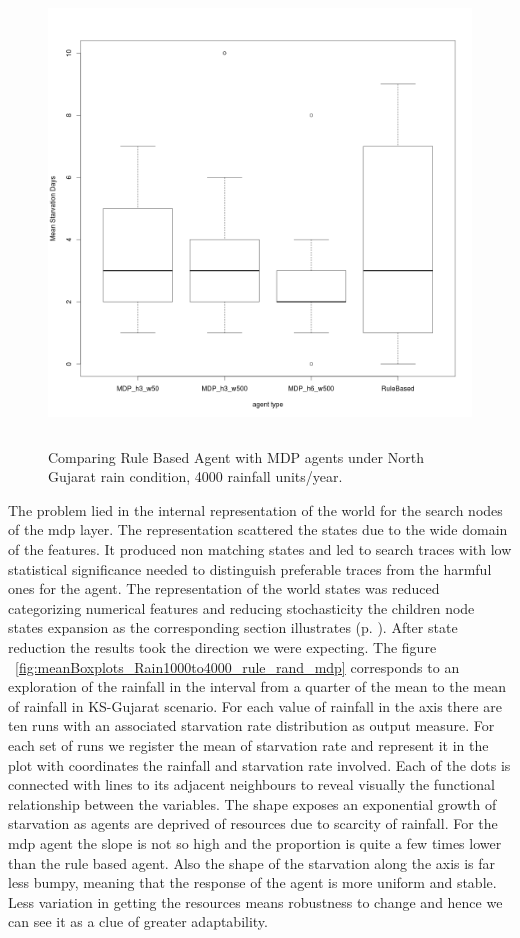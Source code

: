 \documentclass[11pt,oneside,a4paper,openright]{report}
\begin{document}
\begin{figure}[!htb]
\centering
\includegraphics[height=12.2cm]{figures/expm/noReduccClim4000}
\caption{Comparing Rule Based Agent with MDP agents under North Gujarat rain condition, 4000 rainfall 
units/year.}
\label{fig:noReduccClim4000}
\end{figure}


The problem lied in the internal representation of the world for the search nodes of the mdp layer. The 
representation scattered the states due to the wide domain of the features. It produced non matching states
and led to search traces with low statistical significance needed to distinguish preferable traces
from the harmful ones for the agent. The representation of the world states was reduced categorizing numerical
features and reducing stochasticity the children node states expansion as the corresponding section illustrates
(p. \pageref{sec:ReduccStates}).
After state reduction the results took the direction we were expecting. The figure 
~\ref{fig:meanBoxplots_Rain1000to4000_rule_rand_mdp} corresponds to an exploration of the rainfall in the 
interval from a quarter of the mean to the mean of rainfall in KS-Gujarat scenario. For each value of rainfall
in the axis there are ten runs with an associated starvation rate distribution as output measure. For
each set of runs we register the mean of starvation rate and represent it in the plot with coordinates the 
rainfall and starvation rate involved. Each of the dots is connected with lines to its adjacent neighbours 
to reveal visually the functional relationship between the variables. 
The shape exposes an exponential growth of starvation as agents are deprived of resources due to scarcity of 
rainfall. For the mdp agent the slope is not so high and the proportion is quite a few times lower than the 
rule based agent. Also the shape of the starvation along the axis is far less bumpy, meaning that the response 
of the agent is more uniform and stable. Less variation in getting the resources means robustness to change
and hence we can see it as a clue of greater adaptability.
\end{document}
